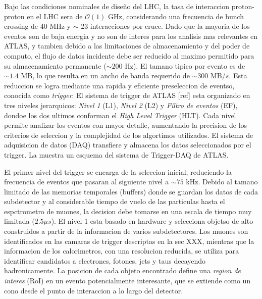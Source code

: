 Bajo las condiciones nominales de dise\~no del LHC, la tasa de interaccion
proton-proton en el LHC sera de $\mathcal{O}(1)$ GHz, considerando una
frecuencia de bunch crossing de 40 MHz y $\sim$ 23 interacciones por cruce. Dado
que la mayoria de los eventos son de baja energia y no son de interes para los
analisis mas relevantes en ATLAS, y tambien debido a las limitaciones de
almacenamiento y del poder de computo, el flujo de datos incidente debe ser
reducido al maximo permitido para su almacenamiento permanente ($\sim 200$ Hz).
El tamano tipico por evento es de $\sim 1.4$ MB, lo que resulta en un ancho de
banda requerido de $\sim 300$ MB/$s$. Esta reduccion se logra mediante una
rapida y eficiente preseleccion de eventso, conocida como \emph{trigger}. El
sistema de trigger de ATLAS [ref] esta organizado en tres niveles jerarquicos:
\emph{Nivel 1} (L1), \emph{Nivel 2} (L2) y \emph{Filtro de eventos} (EF), dondoe
los dos ultimos conforman el \emph{High Level Trigger} (HLT). Cada nivel permite
analizar los eventos con mayor detalle, aumentando la precision de los criterios
de seleccion y la complejidad de los algortimos utilizados. El sistema de
adquisicion de datos (DAQ) transfiere y almacena los datos seleccionados por el
trigger. La {\fig} {\XXX} muestra un esquema del sistema de Trigger-DAQ de
ATLAS.

El primer nivel del trigger se encarga de la seleccion inicial, reduciendo la
frecuencia de eventos que pasaran al siguiente nivel a $\sim 75$ kHz. Debido al
tamano limitado de las memorias temporales (buffers) donde se guardan los datos
de cada subdetector y al considerable tiempo de vuelo de las particulas hasta el
espctrometro de muones, la decision debe tomarse en una escala de tiempo muy
limitada ($2.5 \mu s$). El nivel 1 esta basado en hardware y selecciona objetso
de alto {\pt} construidos a partir de la informacion de varios subdetectores.
Los muones son identificados en las camaras de trigger descriptas en la sec XXX,
mientras que la informacion de los calorimetros, con una resolucion reducida, se
utiliza para identificar candidatos a electrones, fotones, jets y taus decayendo
hadronicamente. La posicion de cada objeto encontrado define una \emph{region de
  interes} (RoI) en un evento potencialmente interesante, que se extiende como
un cono desde el punto de interaccion a lo largo del detector.

